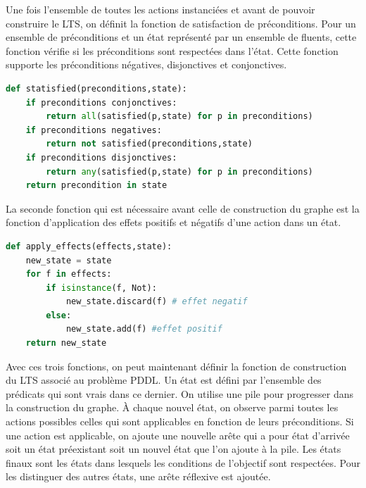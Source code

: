 Une fois l'ensemble de toutes les actions instanciées et avant de pouvoir construire le LTS, on définit la fonction de satisfaction de préconditions. Pour un ensemble de préconditions et un état représenté par un ensemble de fluents, cette fonction vérifie si les préconditions sont respectées dans l'état. Cette fonction supporte les préconditions négatives, disjonctives et conjonctives.

\hfill
\begin{lstlisting}[language=Python,basicstyle=\ttfamily\footnotesize,
                   commentstyle=\color{gray}\itshape,
                   keywordstyle=\bfseries]
def statisfied(preconditions,state):
    if preconditions conjonctives:
        return all(satisfied(p,state) for p in preconditions)
    if preconditions negatives:
        return not satisfied(preconditions,state)
    if preconditions disjonctives:
        return any(satisfied(p,state) for p in preconditions)
    return precondition in state

\end{lstlisting}
\hfill

La seconde fonction qui est nécessaire avant celle de construction du graphe est la fonction d'application des effets positifs et négatifs d'une action dans un état.
\hfill

\begin{lstlisting}[language=Python, basicstyle=\small\ttfamily,
                   commentstyle=\color{gray}\itshape,
                   keywordstyle=\bfseries]
def apply_effects(effects,state):
    new_state = state
    for f in effects:
        if isinstance(f, Not):
            new_state.discard(f) # effet negatif
        else:
            new_state.add(f) #effet positif
    return new_state

\end{lstlisting}
\hfill

Avec ces trois fonctions, on peut maintenant définir la fonction de construction du LTS associé au problème PDDL. Un état est défini par l'ensemble des prédicats qui sont vrais dans ce dernier. On utilise une pile pour progresser dans la construction du graphe. À chaque nouvel état, on observe parmi toutes les actions possibles celles qui sont applicables en fonction de leurs préconditions. Si une action est applicable, on ajoute une nouvelle arête qui a pour état d'arrivée soit un état préexistant soit un nouvel état que l'on ajoute à la pile. Les états finaux sont les états dans lesquels les conditions de l'objectif sont respectées. Pour les distinguer des autres états, une arête réflexive est ajoutée. 

